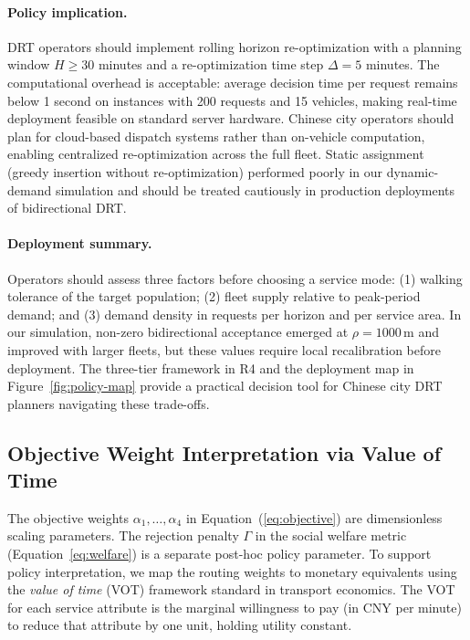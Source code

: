 \paragraph{Policy implication.}
DRT operators should implement rolling horizon re-optimization with a
planning window $H \geq 30$ minutes and a re-optimization time step
$\Delta = 5$ minutes. The computational overhead is acceptable: average
decision time per request remains below 1 second on instances with 200
requests and 15 vehicles, making real-time deployment feasible on standard
server hardware. Chinese city operators should plan for cloud-based dispatch
systems rather than on-vehicle computation, enabling centralized
re-optimization across the full fleet. Static assignment (greedy insertion
without re-optimization) performed poorly in our dynamic-demand simulation and
should be treated cautiously in production deployments of bidirectional DRT.

\paragraph{Deployment summary.}
Operators should assess three factors before choosing a service mode:
(1) walking tolerance of the target population; (2) fleet supply relative
to peak-period demand; and (3) demand density in requests per horizon and
per service area. In our simulation, non-zero bidirectional acceptance emerged
at $\rho = 1000$\,m and improved with larger fleets, but these values require
local recalibration before deployment. The three-tier framework in R4 and the deployment map in
Figure~\ref{fig:policy-map} provide a practical decision tool for Chinese
city DRT planners navigating these trade-offs.

\subsection{Objective Weight Interpretation via Value of Time}\label{subsec:vot-mapping}

The objective weights $\alpha_1, \ldots, \alpha_4$ in Equation~(\ref{eq:objective})
are dimensionless scaling parameters. The rejection penalty $\Gamma$ in the social
welfare metric (Equation~\ref{eq:welfare}) is a separate post-hoc policy parameter.
To support policy interpretation, we map the routing weights to monetary equivalents
using the \emph{value of time} (VOT) framework standard in transport economics.
The VOT for each service attribute is the marginal willingness to pay (in CNY per
minute) to reduce that attribute by one unit, holding utility constant.

